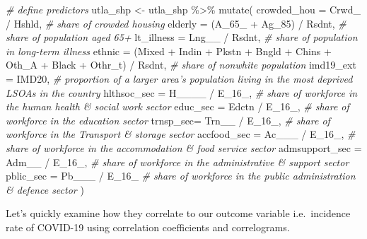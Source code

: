 \documentclass[
]{book}
\newenvironment{Shaded}{\begin{snugshade}}{\end{snugshade}}
\newcommand{\AttributeTok}[1]{\textcolor[rgb]{0.77,0.63,0.00}{#1}}
\newcommand{\CommentTok}[1]{\textcolor[rgb]{0.56,0.35,0.01}{\textit{#1}}}
\newcommand{\FunctionTok}[1]{\textcolor[rgb]{0.00,0.00,0.00}{#1}}
\newcommand{\NormalTok}[1]{#1}
\newcommand{\OtherTok}[1]{\textcolor[rgb]{0.56,0.35,0.01}{#1}}
\newcommand{\SpecialCharTok}[1]{\textcolor[rgb]{0.00,0.00,0.00}{#1}}
\begin{document}
\begin{Shaded}
\begin{Highlighting}[]
\CommentTok{\# define predictors}
\NormalTok{utla\_shp }\OtherTok{\textless{}{-}}\NormalTok{ utla\_shp }\SpecialCharTok{\%\textgreater{}\%} \FunctionTok{mutate}\NormalTok{(}
  \AttributeTok{crowded\_hou =}\NormalTok{ Crwd\_ }\SpecialCharTok{/}\NormalTok{ Hshld, }\CommentTok{\# share of crowded housing}
  \AttributeTok{elderly =}\NormalTok{ (A\_65\_ }\SpecialCharTok{+}\NormalTok{ Ag\_85) }\SpecialCharTok{/}\NormalTok{ Rsdnt, }\CommentTok{\# share of population aged 65+}
  \AttributeTok{lt\_illness =}\NormalTok{ Lng\_\_ }\SpecialCharTok{/}\NormalTok{ Rsdnt, }\CommentTok{\# share of population in long{-}term illness}
  \AttributeTok{ethnic =}\NormalTok{ (Mixed }\SpecialCharTok{+}\NormalTok{ Indin }\SpecialCharTok{+}\NormalTok{ Pkstn }\SpecialCharTok{+}\NormalTok{ Bngld }\SpecialCharTok{+}\NormalTok{ Chins }\SpecialCharTok{+}\NormalTok{ Oth\_A }\SpecialCharTok{+}\NormalTok{ Black }\SpecialCharTok{+}\NormalTok{ Othr\_t) }\SpecialCharTok{/}\NormalTok{ Rsdnt, }\CommentTok{\# share of nonwhite population}
  \AttributeTok{imd19\_ext =}\NormalTok{ IMD20, }\CommentTok{\# proportion of a larger area’s population living in the most deprived LSOAs in the country}
  \AttributeTok{hlthsoc\_sec =}\NormalTok{ H\_\_\_\_ }\SpecialCharTok{/}\NormalTok{ E\_16\_, }\CommentTok{\# share of workforce in the human health \& social work sector}
  \AttributeTok{educ\_sec =}\NormalTok{ Edctn }\SpecialCharTok{/}\NormalTok{ E\_16\_, }\CommentTok{\# share of workforce in the education sector}
  \AttributeTok{trnsp\_sec=}\NormalTok{ Trn\_\_ }\SpecialCharTok{/}\NormalTok{ E\_16\_, }\CommentTok{\# share of workforce in the Transport \& storage sector}
  \AttributeTok{accfood\_sec =}\NormalTok{ Ac\_\_\_ }\SpecialCharTok{/}\NormalTok{ E\_16\_, }\CommentTok{\# share of workforce in the accommodation \& food service sector}
  \AttributeTok{admsupport\_sec =}\NormalTok{ Adm\_\_ }\SpecialCharTok{/}\NormalTok{  E\_16\_, }\CommentTok{\# share of workforce in the administrative \& support sector}
  \AttributeTok{pblic\_sec =}\NormalTok{ Pb\_\_\_ }\SpecialCharTok{/}\NormalTok{ E\_16\_ }\CommentTok{\# share of workforce in the public administration \& defence sector}
\NormalTok{)}
\end{Highlighting}
\end{Shaded}

Let's quickly examine how they correlate to our outcome variable i.e.~incidence rate of COVID-19 using correlation coefficients and correlograms.
\end{document}
